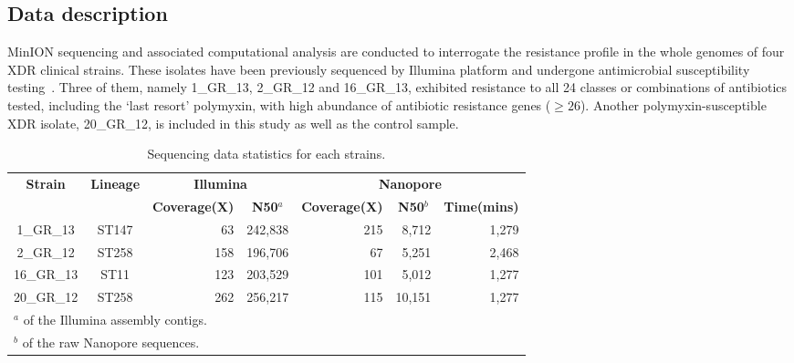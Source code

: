 \subsection{Data description}
MinION sequencing and associated computational analysis are conducted to interrogate the resistance profile in the whole genomes of four XDR clinical \kp{} strains. These isolates have been previously sequenced by Illumina platform and undergone antimicrobial susceptibility testing~\cite{Miranda2018}.
Three of them, namely 1\_GR\_13, 2\_GR\_12 and 16\_GR\_13, exhibited resistance to all 24 classes or combinations of antibiotics tested, including the `last resort' polymyxin, with high abundance of antibiotic resistance genes ($\geq 26$). Another polymyxin-susceptible XDR isolate, 20\_GR\_12, is included in this study as well as the control sample.
\begin{table}[!hpt]
\centering
\caption{Sequencing data statistics for each \kp{} strains.}
\label{tab:assers_stats}
\begin{tabular}{|c|c|r|r|r|r|r|}
\hline
\multirow{2}{*}{\textbf{Strain}} & \multirow{2}{*}{\textbf{Lineage}} & \multicolumn{2}{c|}{\textbf{Illumina}}                                     & \multicolumn{3}{c|}{\textbf{Nanopore}}                                                            \\ \cline{3-7} 
                                 &                                   & \multicolumn{1}{c|}{\textbf{Coverage(X)}} & \multicolumn{1}{c|}{\textbf{N50$^a$}} & \multicolumn{1}{c|}{\textbf{Coverage(X)}} & \multicolumn{1}{c|}{\textbf{N50$^b$}} & \textbf{Time(mins)} \\ \hline
1\_GR\_13                        & ST147                             & 63                                     & 242,838                           & 215                                    & 8,712                             & 1,279                \\ \hline
2\_GR\_12                        & ST258                             & 158                                    & 196,706                           & 67                                     & 5,251                             & 2,468                \\ \hline
16\_GR\_13                       & ST11                              & 123                                    & 203,529                           & 101                                    & 5,012                             & 1,277                \\ \hline
20\_GR\_12                       & ST258                             & 262                                    & 256,217                           & 115                                    & 10,151                            & 1,277                \\ \hline

\multicolumn{7}{l}{\small{$^a$ of the Illumina assembly contigs.}}\\
\multicolumn{7}{l}{\small{$^b$ of the raw Nanopore sequences.}}
\end{tabular}
\end{table}

